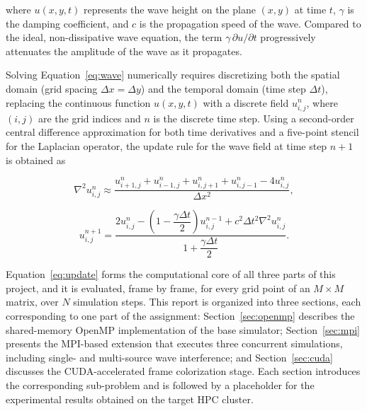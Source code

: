 \documentclass[10pt,twocolumn]{article}
\begin{document}
where $u(x,y,t)$ represents the wave height on the plane $(x,y)$ at
time $t$, $\gamma$ is the
damping coefficient, and $c$ is the propagation speed of the wave.
Compared to the ideal,
non-dissipative wave equation, the term $\gamma \, \partial u /
\partial t$ progressively
attenuates the amplitude of the wave as it propagates.

Solving Equation~\eqref{eq:wave} numerically requires discretizing
both the spatial domain
(grid spacing $\Delta x = \Delta y$) and the temporal domain (time
step $\Delta t$), replacing
the continuous function $u(x,y,t)$ with a discrete field
$u_{i,j}^{n}$, where $(i,j)$ are the
grid indices and $n$ is the discrete time step. Using a second-order
central difference
approximation for both time derivatives and a five-point stencil for
the Laplacian operator,
the update rule for the wave field at time step $n+1$ is obtained as

\begin{equation}
  \nabla^2 u_{i,j}^{n} \approx
  \frac{u_{i+1,j}^{n} + u_{i-1,j}^{n} + u_{i,j+1}^{n} + u_{i,j-1}^{n}
  - 4u_{i,j}^{n}}{\Delta x^2},
  \label{eq:laplacian}
\end{equation}

\begin{equation}
  u_{i,j}^{n+1} =
  \frac{2u_{i,j}^{n} - \left(1 - \dfrac{\gamma \Delta t}{2}\right)u_{i,j}^{n-1}
  + c^2 \Delta t^2 \nabla^2 u_{i,j}^{n}}
  {1 + \dfrac{\gamma \Delta t}{2}}.
  \label{eq:update}
\end{equation}

Equation~\eqref{eq:update} forms the computational core of all three
parts of this project,
and it is evaluated, frame by frame, for every grid point of an $M
\times M$ matrix, over $N$
simulation steps. This report is organized into three sections, each
corresponding to one part
of the assignment: Section~\ref{sec:openmp} describes the
shared-memory OpenMP implementation
of the base simulator; Section~\ref{sec:mpi} presents the MPI-based
extension that executes
three concurrent simulations, including single- and multi-source wave
interference; and
Section~\ref{sec:cuda} discusses the CUDA-accelerated frame
colorization stage. Each section
introduces the corresponding sub-problem and is followed by a
placeholder for the experimental
results obtained on the target HPC cluster.




\end{document}
